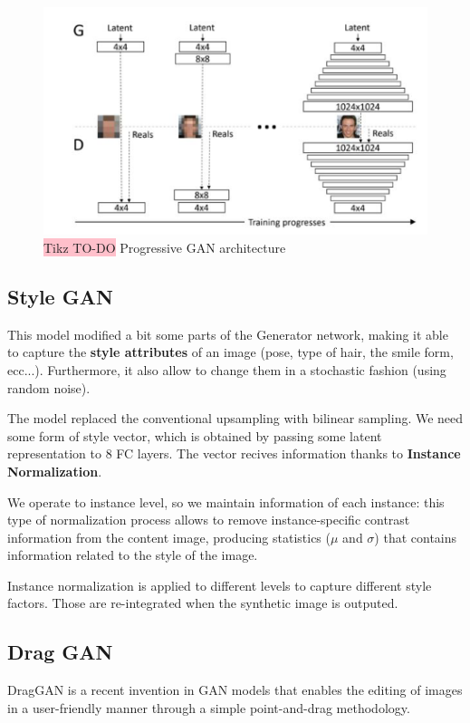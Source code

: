 \begin{figure}[!htbp]
    \centering
    \includegraphics[width=\linewidth]{tikz/Progressive GAN.png}
    \caption{{\color{red}\colorbox{pink}{Tikz TO-DO}} Progressive GAN architecture}
    \label{fig:progressive-GAN}
\end{figure}


\subsection{Style GAN}

This model modified a bit some parts of the Generator network, making it able to capture the \textbf{style attributes} of an image (pose, type of hair, the smile form, ecc...). Furthermore, it also allow to change them in a stochastic fashion (using random noise).


The model replaced the conventional upsampling with bilinear sampling. We need some form of style vector, which is obtained by passing some latent representation to 8 FC layers. The vector recives information thanks to \textbf{Instance Normalization}.

We operate to instance level, so we maintain information of each instance: this type of normalization process allows to remove instance-specific contrast information from the content image, producing statistics ($\mu$ and $\sigma$) that contains information related to the style of the image. 

Instance normalization is applied to different levels to capture different style factors. Those are re-integrated when the synthetic image is outputed.


\subsection{Drag GAN}
DragGAN is a recent invention in GAN models that enables the editing of images in a user-friendly manner through a simple point-and-drag methodology. 

